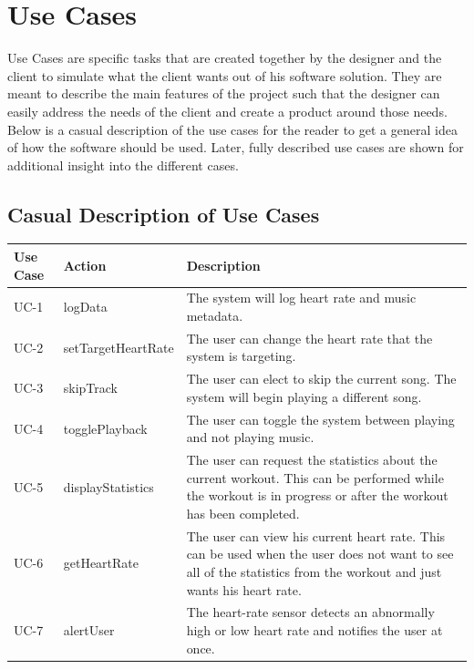 \documentclass[letterpaper,english, 12pt]{scrreprt}
\begin{document}
\section{Use Cases}
Use Cases are specific tasks that are created together by the designer and the client to simulate what the client wants out of his software solution. They are meant to describe the main features of the project such that the designer can easily address the needs of the client and create a product around those needs. Below is a casual description of the use cases for the reader to get a general idea of how the software should be used. Later, fully described use cases are shown for additional insight into the different cases.

\subsection{Casual Description of Use Cases}
\begin{center}
        \begin{tabular}{|C{2cm}|C{2cm}|C{10cm}|}
                \hline
                        Use Case & Action & Description \\
                \hline
                        UC-1 & logData & The system will log heart rate and music metadata.\\
                \hline
                        UC-2 & setTargetHeartRate & The user can change the heart rate that the system is targeting.\\
                \hline
                        UC-3 & skipTrack & The user can elect to skip the current song. The system will begin playing a different song.\\
                \hline
                        UC-4 & togglePlayback & The user can toggle the system between playing and not playing music.\\
                \hline
                        UC-5 & displayStatistics& The user can request the statistics about the current workout. This can be performed while the workout is in progress or after the workout has been completed. \\
                \hline
                        UC-6 & getHeartRate & The user can view his current heart rate. This can be used when the user does not want to see all of the statistics from the workout and just wants his heart rate. \\
                \hline
                        UC-7 & alertUser & The heart-rate sensor detects an abnormally high or low heart rate and notifies the user at once.\\
                \hline
        \end{tabular}
\end{center}
\end{document}
